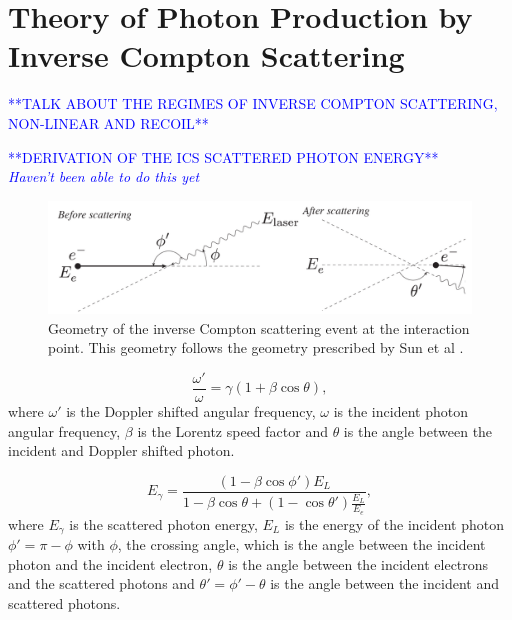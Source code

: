 \documentclass[../main.tex]{subfiles}
\begin{document}
\chapter{Theory of Photon Production by Inverse Compton Scattering}
\label{Theory_of_Photon_Production_by_Inverse_Compton_Scattering} %

\textcolor{blue}{**TALK ABOUT THE REGIMES OF INVERSE COMPTON SCATTERING, NON-LINEAR AND RECOIL**}

\textcolor{blue}{**DERIVATION OF THE ICS SCATTERED PHOTON ENERGY**\\
\textit{Haven't been able to do this yet}}

\begin{figure}[!htb]
    \centering
    \includegraphics[width=\textwidth]{Figures/Theory_of_Photon_Production_by_Inverse_Compton_Scattering/scatteringkinematicsdiagram.pdf}
    \caption{Geometry of the inverse Compton scattering event at the interaction point. This geometry follows the geometry prescribed by Sun et al \cite{sun2009energy}. }
    \label{fig:scattered_photon_kinematics}
\end{figure}

\begin{equation}
\frac{\omega'}{\omega} = \gamma\left(1+\beta\cos\theta\right),
\label{eq:doppler_shift}
\end{equation}
where $\omega'$ is the Doppler shifted angular frequency, $\omega$ is the incident photon angular frequency, $\beta$ is the Lorentz speed factor and $\theta$ is the angle between the incident and Doppler shifted photon. 

\begin{equation}
E_{\gamma} = \frac{\left(1-\beta\cos\phi'\right)E_{L}}{1-\beta\cos\theta+\left(1-\cos\theta'\right)\frac{E_{L}}{E_{e}}}, 
\label{eq:scattered_photon_energy}
\end{equation}
where $E_{\gamma}$ is the scattered photon energy, $E_{L}$ is the energy of the incident photon $\phi'=\pi-\phi$ with $\phi$, the crossing angle, which is the angle between the incident photon and the incident electron, $\theta$ is the angle between the incident electrons and the scattered photons and $\theta'=\phi'-\theta$ is the angle between the incident and scattered photons.  
\end{document}
